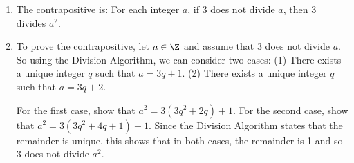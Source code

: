 \begin{list}{\bf{\ref{exer:sec35-a2mod3}.}}
\item \begin{enumerate}
\item The contrapositive is:  For each integer $a$, if 3 does not divide $a$, then 3 divides $a^2$.
\item To prove the contrapositive, let $a \in \Z$ and assume that 3 does not divide $a$.  So using the Division Algorithm, we can consider two cases:  (1) There exists a unique integer $q$ such that $a = 3q + 1$.  (2) There exists a unique integer $q$ such that $a = 3q + 2$.

For the first case, show that $a^2 = 3 \left( 3q^2 + 2q \right) + 1$.  For the second case, show that $a^2 = 3 \left( 3q^2 + 4q + 1 \right) + 1$.  Since the Division Algorithm states that the remainder is unique, this shows that in both cases, the remainder is 1 and so 3 does not divide $a^2$.
\end{enumerate}
\end{list}






